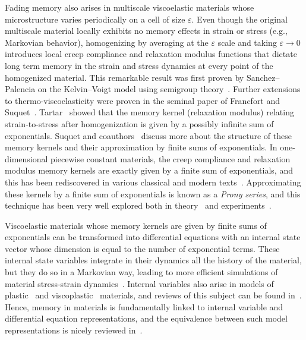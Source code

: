 \documentclass[letterpaper,11pt]{article}
\begin{document}
Fading memory also arises in multiscale viscoelastic materials whose microstructure varies periodically on a cell of size $\varepsilon$. Even though the original multiscale material locally exhibits no memory effects in strain or stress (e.g., Markovian behavior), homogenizing by averaging at the $\varepsilon$ scale and taking $\varepsilon \to 0$ introduces local creep compliance and relaxation modulus functions that dictate long term memory in the strain and stress dynamics at every point of the homogenized material. This remarkable result was first proven by Sanchez--Palencia on the Kelvin--Voigt model using semigroup theory~\cite[Chapter 6]{sanchez1980non}. Further extensions to thermo-viscoelasticity were proven in the seminal paper of Francfort and Suquet~\cite{francfort1986homogenization}. Tartar~\cite{tartar1991memory} showed that the memory kernel (relaxation modulus) relating strain-to-stress after homogenization is given by a possibly infinite sum of exponentials. Suquet and coauthors~\cite{brenner2013overall, lahellec2024effective, lahellec2024effective2} discuss more about the structure of these memory kernels and their approximation by finite sums of exponentials. In one-dimensional piecewise constant materials, the creep compliance and relaxation modulus memory kernels are exactly given by a finite sum of exponentials, and this has been rediscovered in various classical and modern texts~\cite{gross1968mathematical, bhattacharya2023learning}. Approximating these kernels by a finite sum of exponentials is known as a \textit{Prony series}, and this technique has been very well explored both in theory~\cite{lahellec2024effective, serra2019viscoelastic, tschoegl2012phenomenological} and experiments~\cite{kim2024experimental, kraus2017parameter, nikonov2005determination, shanbhag2023computer}.

Viscoelastic materials whose memory kernels are given by finite sums of exponentials can be transformed into differential equations with an internal state vector whose dimension is equal to the number of exponential terms. These internal state variables integrate in their dynamics all the history of the material, but they do so in a Markovian way, leading to more efficient simulations of material stress-strain dynamics~\cite{bhattacharya2023learning, liu2023learning}. Internal variables also arise in models of plastic~\cite{rice1971inelastic} and viscoplastic~\cite{liu2023learning} materials, and reviews of this subject can be found in~\cite{billington1982physics, horstemeyer2010historical}. Hence, memory in materials is fundamentally linked to internal variable and differential equation representations, and the equivalence between such model representations is nicely reviewed in~\cite{eggersmann2019model}.~\\
\end{document}
